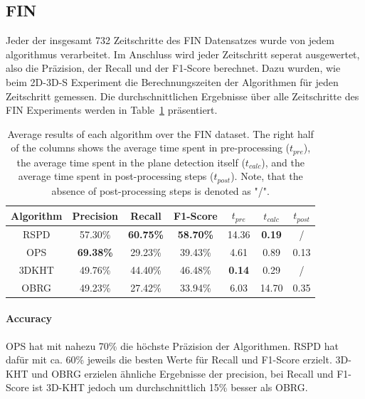 \documentclass[main.tex]{subfiles}
\begin{document}
\subsection{FIN}
Jeder der insgesamt 732 Zeitschritte des FIN Datensatzes wurde von jedem algorithmus verarbeitet. Im Anschluss wird 
jeder Zeitschritt seperat ausgewertet, also die Präzision, der Recall und der F1-Score berechnet. Dazu 
wurden, wie beim 2D-3D-S Experiment die Berechnungszeiten der Algorithmen für jeden Zeitschritt gemessen.  
Die durchschnittlichen Ergebnisse über alle Zeitschritte des FIN Experiments werden
in Table~\ref{tab:res-fin-total} präsentiert.

\begin{table}[H]
    \centering
    \begin{tabular}{c|cccccc}
        Algorithm & Precision        & Recall           & F1-Score         & $t_{pre}$     & $t_{calc}$    & $t_{post}$ \\ \hline
        RSPD      & 57.30\%          & \textbf{60.75\%} & \textbf{58.70\%} & 14.36         & \textbf{0.19} & /          \\
        OPS       & \textbf{69.38\%} & 29.23\%          & 39.43\%          & 4.61          & 0.89          & 0.13       \\
        3DKHT     & 49.76\%          & 44.40\%          & 46.48\%          & \textbf{0.14} & 0.29          & /          \\
        OBRG      & 49.23\%          & 27.42\%          & 33.94\%          & 6.03          & 14.70         & 0.35
    \end{tabular}
    \caption[Overall 2D-3D-S Results]{Average results of each algorithm over the FIN dataset. The right half of the columns shows the average time spent in
        pre-processing ($t_{pre}$), the average time spent in the plane detection itself ($t_{calc}$), and the average time spent in post-processing steps ($t_{post}$).
        Note, that the absence of post-processing steps is denoted as "/".}
    \label{tab:res-fin-total}
\end{table}

\paragraph{Accuracy}
OPS hat mit nahezu 70\% die höchste Präzision der Algorithmen. RSPD hat dafür mit ca. 60\% jeweils die besten
Werte für Recall und F1-Score erzielt. 3D-KHT und OBRG erzielen ähnliche Ergebnisse der precision, bei Recall und 
F1-Score ist 3D-KHT jedoch um durchschnittlich 15\% besser als OBRG.
\end{document}
